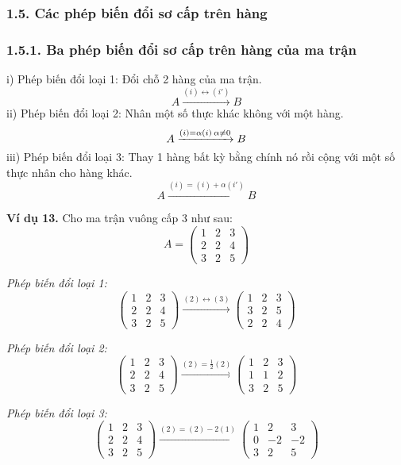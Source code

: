 \subsubsection*{1.5. Các phép biến đổi sơ cấp trên hàng}
\subsubsection*{1.5.1. Ba phép biến đổi sơ cấp trên hàng của ma trận}
i) Phép biến đổi loại 1: Đổi chỗ 2 hàng của ma trận.
\[
A \xrightarrow{(i) \leftrightarrow (i')} B
\]
ii) Phép biến đổi loại 2: Nhân một số thực khác không với một hàng.
\[
A \xrightarrow{(i)=\alpha(i) \\ \alpha \neq 0} B
\]
iii) Phép biến đổi loại 3: Thay 1 hàng bất kỳ bằng chính nó rồi cộng với một số thực nhân cho hàng khác.
\[
A \xrightarrow{(i)=(i)+\alpha(i')} B
\]

\textbf{Ví dụ 13.} Cho ma trận vuông cấp 3 như sau:
\[
A = \begin{pmatrix}
1 & 2 & 3 \\
2 & 2 & 4 \\
3 & 2 & 5
\end{pmatrix}
\]

\textit{Phép biến đổi loại 1:}
\[
\begin{pmatrix}
1 & 2 & 3 \\
2 & 2 & 4 \\
3 & 2 & 5
\end{pmatrix}
\xrightarrow{(2) \leftrightarrow (3)}
\begin{pmatrix}
1 & 2 & 3 \\
3 & 2 & 5 \\
2 & 2 & 4
\end{pmatrix}
\]

\textit{Phép biến đổi loại 2:}
\[
\begin{pmatrix}
1 & 2 & 3 \\
2 & 2 & 4 \\
3 & 2 & 5
\end{pmatrix}
\xrightarrow{(2) = \frac{1}{2}(2)}
\begin{pmatrix}
1 & 2 & 3 \\
1 & 1 & 2 \\
3 & 2 & 5
\end{pmatrix}
\]

\textit{Phép biến đổi loại 3:}
\[
\begin{pmatrix}
1 & 2 & 3 \\
2 & 2 & 4 \\
3 & 2 & 5
\end{pmatrix}
\xrightarrow{(2) = (2) - 2(1)}
\begin{pmatrix}
1 & 2 & 3 \\
0 & -2 & -2 \\
3 & 2 & 5
\end{pmatrix}
\]
